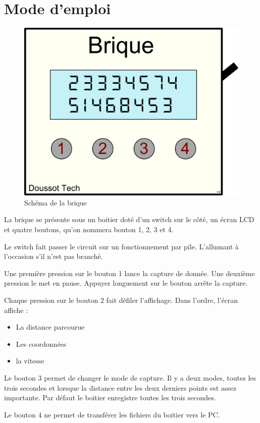 \documentclass[a4paper,12pt,titlepage]{article}
\begin{document}
\section{Mode d'emploi}

\begin{figure}[H]
	\centering
	\includegraphics[width=\textwidth]{brique_dessin.png}
	\caption{Schéma de la brique}
	\label{brique_dessin}
\end{figure}

La brique se présente sous un boitier doté d'un switch sur le côté, un écran LCD et quatre boutons, qu'on nommera bouton 1, 2, 3 et 4.

\bigskip
Le switch fait passer le circuit sur un fonctionnement par pile. L'allumant à l'occasion s'il n'est pas branché.

Une première pression sur le bouton 1 lance la capture de donnée. Une deuxième pression le met en pause. Appuyer longuement sur le bouton arrête la capture.

Chaque pression sur le bouton 2 fait défiler l'affichage. Dans l'ordre, l'écran affiche : 
\begin{itemize}
\item La distance parcourue
\item Les coordonnées
\item la vitesse
\end{itemize}

Le bouton 3 permet de changer le mode de capture. Il y a deux modes, toutes les trois secondes et lorsque la distance entre les deux derniers points est assez importante.
Par défaut le boitier enregistre toutes les trois secondes.

Le bouton 4 ne permet de transférer les fichiers du boitier vers le PC.
\end{document}
